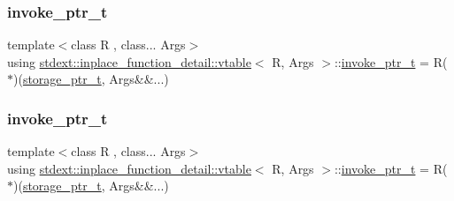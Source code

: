 \mbox{\label{structstdext_1_1inplace__function__detail_1_1vtable_af01857ded8c77028b981d09f77903ffb}} 
\subsubsection{\texorpdfstring{invoke\+\_\+ptr\+\_\+t}{invoke\_ptr\_t}\hspace{0.1cm}{\footnotesize\ttfamily [1/2]}}
{\footnotesize\ttfamily template$<$class R , class... Args$>$ \\
using \hyperlink{structstdext_1_1inplace__function__detail_1_1vtable}{stdext\+::inplace\+\_\+function\+\_\+detail\+::vtable}$<$ R, Args $>$\+::\hyperlink{structstdext_1_1inplace__function__detail_1_1vtable_af01857ded8c77028b981d09f77903ffb}{invoke\+\_\+ptr\+\_\+t} =  R($\ast$)(\hyperlink{structstdext_1_1inplace__function__detail_1_1vtable_afbcc981dca754e07bf57710ac26880f2}{storage\+\_\+ptr\+\_\+t}, Args\&\&...)}

\mbox{\label{structstdext_1_1inplace__function__detail_1_1vtable_af01857ded8c77028b981d09f77903ffb}} 
\subsubsection{\texorpdfstring{invoke\+\_\+ptr\+\_\+t}{invoke\_ptr\_t}\hspace{0.1cm}{\footnotesize\ttfamily [2/2]}}
{\footnotesize\ttfamily template$<$class R , class... Args$>$ \\
using \hyperlink{structstdext_1_1inplace__function__detail_1_1vtable}{stdext\+::inplace\+\_\+function\+\_\+detail\+::vtable}$<$ R, Args $>$\+::\hyperlink{structstdext_1_1inplace__function__detail_1_1vtable_af01857ded8c77028b981d09f77903ffb}{invoke\+\_\+ptr\+\_\+t} =  R($\ast$)(\hyperlink{structstdext_1_1inplace__function__detail_1_1vtable_afbcc981dca754e07bf57710ac26880f2}{storage\+\_\+ptr\+\_\+t}, Args\&\&...)}

